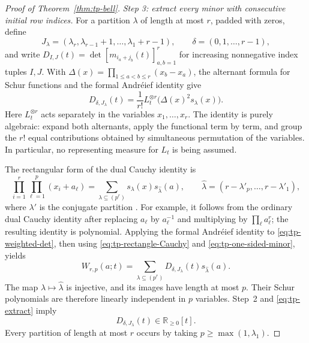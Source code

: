 \documentclass[11pt,a4paper]{article}
\theoremstyle{definition}
\theoremstyle{remark}
\numberwithin{equation}{section}
\begin{document}
\begin{proof}[Proof of Theorem~\ref{thm:tp-bell}]
\smallskip\noindent
\emph{Step 3: extract every minor with consecutive initial row indices.}
For a partition $\lambda$ of length at most $r$, padded with zeros, define
\[
 J_\lambda=(\lambda_r,\lambda_{r-1}+1,\ldots,\lambda_1+r-1),
 \qquad \delta=(0,1,\ldots,r-1),
\]
and write $D_{I,J}(t)=\det[m_{i_a+j_b}(t)]_{a,b=1}^r$ for increasing
nonnegative index tuples $I,J$.  With
$\Delta(x)=\prod_{1\leq a<b\leq r}(x_b-x_a)$, the alternant formula
for Schur functions and the formal Andr\'eief identity give
\begin{equation}
 D_{\delta,J_\lambda}(t)
 =\frac1{r!}L_t^{\otimes r}\bigl(\Delta(x)^2s_\lambda(x)\bigr).
 \label{eq:tp-one-sided-minor}
\end{equation}
Here $L_t^{\otimes r}$ acts separately in the variables $x_1,\ldots,x_r$.
The identity is purely algebraic: expand both alternants, apply the
functional term by term, and group the $r!$ equal contributions obtained
by simultaneous permutation of the variables.  In particular, no
representing measure for $L_t$ is being assumed.

The rectangular form of the dual Cauchy identity is
\begin{equation}
 \prod_{i=1}^r\prod_{\ell=1}^p(x_i+a_\ell)
 =\sum_{\lambda\subseteq(p^r)}s_\lambda(x)s_{\widehat\lambda}(a),
 \qquad
 \widehat\lambda=(r-\lambda'_p,\ldots,r-\lambda'_1),
 \label{eq:tp-rectangle-Cauchy}
\end{equation}
where $\lambda'$ is the conjugate partition
\cite[Chapter~I]{Macdonald1995}.  For example, it follows from
the ordinary dual Cauchy identity after replacing $a_\ell$ by
$a_\ell^{-1}$ and multiplying by $\prod_\ell a_\ell^r$; the resulting
identity is polynomial.  Applying the formal Andr\'eief identity to
\eqref{eq:tp-weighted-det}, then using
\eqref{eq:tp-rectangle-Cauchy} and \eqref{eq:tp-one-sided-minor}, yields
\begin{equation}
 W_{r,p}(a;t)=\sum_{\lambda\subseteq(p^r)}
 D_{\delta,J_\lambda}(t)s_{\widehat\lambda}(a).
 \label{eq:tp-extract}
\end{equation}
The map $\lambda\mapsto\widehat\lambda$ is injective, and its images
have length at most $p$.  Their Schur polynomials are therefore linearly
independent in $p$ variables.  Step~2 and \eqref{eq:tp-extract} imply
\[
 D_{\delta,J_\lambda}(t)\in\mathbb R_{\geq0}[t].
\]
Every partition of length at most $r$ occurs by taking
$p\geq\max(1,\lambda_1)$.


\end{proof}
\end{document}
